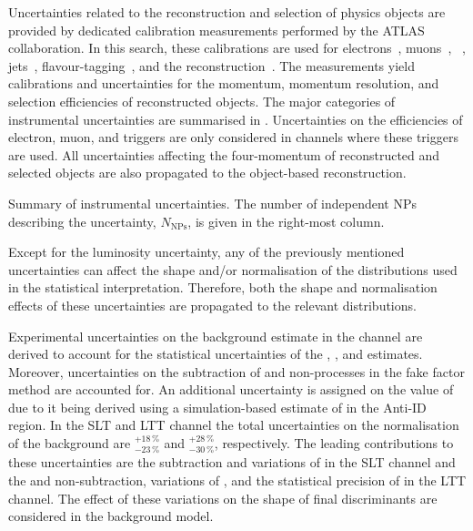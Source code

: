 Uncertainties related to the reconstruction and selection of physics objects are
provided by dedicated calibration measurements performed by the ATLAS
collaboration. In this search, these calibrations are used for
electrons~\cite{EGAM-2018-01,TRIG-2018-05}, muons~\cite{MUON-2018-03},
\tauhadvis~\cite{ATLAS-CONF-2017-029}, jets~\cite{JETM-2018-05},
flavour-tagging~\cite{FTAG-2018-01,FTAG-2020-08,FTAG-2021-002}, and the
\pTmissAbs reconstruction~\cite{ATLAS-CONF-2018-023}. The measurements yield
calibrations and uncertainties for the momentum, momentum resolution, and
selection efficiencies of reconstructed objects. The major categories of
instrumental uncertainties are summarised in
. Uncertainties on the efficiencies of
electron, muon, and \tauhadvis triggers are only considered in channels where
these triggers are used. All uncertainties affecting the four-momentum of
reconstructed and selected objects are also propagated to the object-based
\pTmissAbs reconstruction.

\begin{table}[htbp]
  \centering

  \caption{Summary of instrumental uncertainties. The number of independent NPs
    describing the uncertainty, $N_{\text{NPs}}$, is given in the right-most
    column.}%
  \label{tab:experimental_uncertainties_2}

  { \renewcommand{\arraystretch}{1.5}  }
\end{table}

Except for the luminosity uncertainty, any of the previously mentioned
uncertainties can affect the shape and/or normalisation of the distributions
used in the statistical interpretation. Therefore, both the shape and
normalisation effects of these uncertainties are propagated to the relevant
distributions.

Experimental uncertainties on the \faketauhadvis background estimate in the
\lephad channel are derived to account for the statistical uncertainties of the
\FFqcd, \FFttbar, and \rqcd estimates. Moreover, uncertainties on the
subtraction of \ttbar and non-\ttbar processes in the fake factor method are
accounted for. An additional uncertainty is assigned on the value of \rqcd due
to it being derived using a simulation-based estimate of \ttbarFakes in the
Anti-ID region. In the \lephad SLT and LTT channel the total uncertainties on
the normalisation of the \faketauhadvis background are $^{+18\,\%}_{-23\,\%}$
and $^{+28\,\%}_{-30\,\%}$, respectively. The leading contributions to these
uncertainties are the \ttbar subtraction and variations of \rqcd in the SLT
channel and the \ttbar and non-\ttbar subtraction, variations of \rqcd, and the
statistical precision of \FFttbar in the LTT channel. The effect of these
variations on the shape of final discriminants are considered in the background
model.


